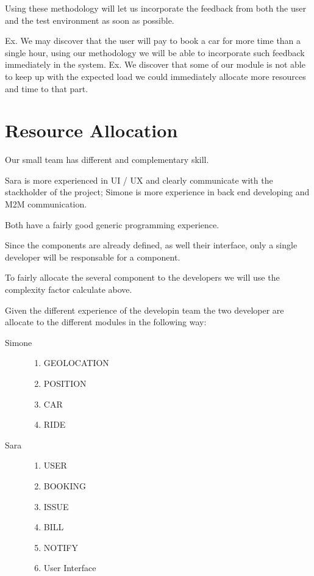 \documentclass[11pt]{article} %
\begin{document}
Using these methodology will let us incorporate the feedback from both the user and the test environment as soon as possible.

Ex. We may discover that the user will pay to book a car for more time than a single hour, using our methodology we will be able to incorporate such feedback immediately in the system.
Ex. We discover that some of our module is not able to keep up with the expected load we could immediately allocate more resources and time to that part.

\section{Resource Allocation}

Our small team has different and complementary skill.

Sara is more experienced in UI / UX and clearly communicate with the stackholder of the project; Simone is more experience in back end developing and M2M communication.

Both have a fairly good generic programming experience.

Since the components are already defined, as well their interface, only a single developer will be responsable for a component.

To fairly allocate the several component to the developers we will use the complexity factor calculate above.

Given the different experience of the developin team the two developer are allocate to the different modules in the following way:

\begin{description}
	\item[Simone] \hfill
		\begin{enumerate}
			\item GEOLOCATION
			\item POSITION
			\item CAR
			\item RIDE
		\end{enumerate}
	\item[Sara] \hfill
		\begin{enumerate}
			\item USER
			\item BOOKING
			\item ISSUE
			\item BILL
			\item NOTIFY
			\item User Interface
		\end{enumerate}
\end{description}
\end{document}
